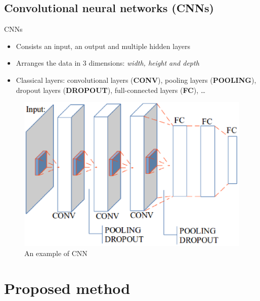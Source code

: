 \documentclass[10pt]{beamer}
\begin{document}
\subsection{Convolutional neural networks (CNNs)}
\begin{frame}{CNNs}
	\begin{itemize}
		\item Consists an input, an output and multiple hidden layers
		\item Arranges the data in $3$ dimensions: \textit{width, height and depth}
		\item Classical layers: convolutional layers (\textbf{CONV}), pooling layers (\textbf{POOLING}), dropout layers (\textbf{DROPOUT}), full-connected layers (\textbf{FC}), \ldots
	\end{itemize}
	\begin{figure}[htbp]
  		\centering
   	 	\includegraphics[scale=.37]{images/convarc.eps}
   	 	\caption{\footnotesize{An example of CNN}}
	\end{figure}
\end{frame}
\section{Proposed method}
\end{document}
